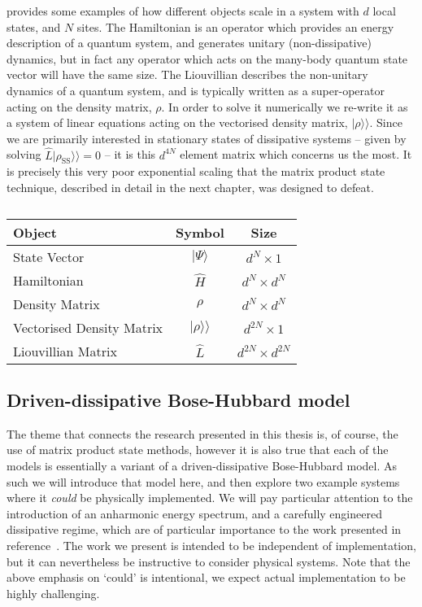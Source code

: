  provides some examples of how different objects scale in a system with \(d\) local states, and \(N\) sites. The Hamiltonian is an operator which provides an energy description of a quantum system, and generates unitary (non-dissipative) dynamics, but in fact any operator which acts on the many-body quantum state vector will have the same size. The Liouvillian describes the non-unitary dynamics of a quantum system, and is typically written as a super-operator acting on the density matrix, \(\rho\). In order to solve it numerically we re-write it as a system of linear equations acting on the vectorised density matrix, \(|\rho\rangle\rangle\). Since we are primarily interested in stationary states of dissipative systems -- given by solving \(\hat{L}|\rho_{\mathrm{SS}}\rangle\rangle = 0\) -- it is this \(d^{4N}\) element matrix which concerns us the most. It is precisely this very poor exponential scaling that the matrix product state technique, described in detail in the next chapter, was designed to defeat.

\begin{table}[ht!]
	\centering
	\begin{tabu}{lcc}
		\hline
		Object & Symbol & Size \\
		\hline
		State Vector & \(|\Psi\rangle\) & \(d^{N} \times 1\) \\
		Hamiltonian & \(\hat{H}\) & \(d^{N} \times d^{N}\) \\
		Density Matrix & \(\rho\) & \(d^{N} \times d^{N}\) \\
		Vectorised Density Matrix & \(|\rho \rangle\rangle\) & \(d^{2N} \times 1\) \\
		Liouvillian Matrix & \(\hat{L}\) & \(d^{2N} \times d^{2N}\)
	\end{tabu}
	\caption{\label{tab:mbq1-1}}
\end{table}

\FloatBarrier
\subsection{Driven-dissipative Bose-Hubbard model}
The theme that connects the research presented in this thesis is, of course, the use of matrix product state methods, however it is also true that each of the models is essentially a variant of a driven-dissipative Bose-Hubbard model. As such we will introduce that model here, and then explore two example systems where it \emph{could} be physically implemented. We will pay particular attention to the introduction of an anharmonic energy spectrum, and a carefully engineered dissipative regime, which are of particular importance to the work presented in reference~\cite{Brown2018}. The work we present is intended to be independent of implementation, but it can nevertheless be instructive to consider physical systems. Note that the above emphasis on `could' is intentional, we expect actual implementation to be highly challenging.

